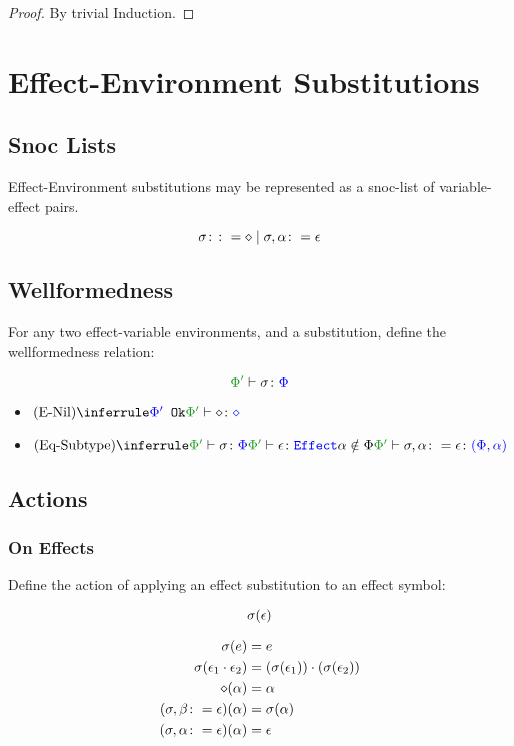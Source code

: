 \documentclass{report}
\begin{document}
        \begin{proof}
            By trivial Induction.
        \end{proof}

\section{Effect-Environment Substitutions}
    \subsection{Snoc Lists}
        Effect-Environment substitutions may be represented as a snoc-list of variable-effect pairs.

        \[
            \sigma \colon\colon= \diamond \mid \sigma, \alpha \colon= \epsilon
        \]

    
    \subsection{Wellformedness}    
        For any two effect-variable environments, and a substitution, define the wellformedness relation:

        \begin{equation}
            \typerelation{\P'}{\si}{\P}
        \end{equation}

        \begin{itemize}
            \item $\ntreeruleI{\esubnil}{\ok{\P'}}{\typerelation{\P'}{\nil}{\nil}}$
            \item $\ntreeruleIII{\eqsubtype}{\typerelation{\P'}{\si}{\P}}{\wellformede{\P'}{\e}}{\a\notin\P}{\typerelation{\P'}{\si, \a \setto\e}{(\P, \a)}}$
        \end{itemize}

    \subsection{Actions}
        \subsubsection{On Effects}
            Define the action of applying an effect substitution to an effect symbol:

            \begin{equation}
               \sigma(\epsilon)
            \end{equation}

            \begin{align*}
                \sigma(e) & = e \\
                \sigma(\epsilon_1\cdot\epsilon_2) & = (\sigma(\epsilon_1))\cdot(\sigma(\epsilon_2))\\
                \diamond(\alpha) & = \alpha\\
                (\sigma, \beta\colon= \epsilon)(\alpha) & = \sigma(\alpha) \\
                (\sigma, \alpha\colon= \epsilon)(\alpha) & =\epsilon
            \end{align*}
\end{document}
